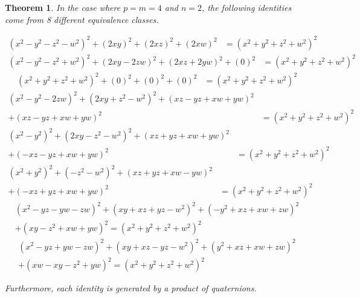 \documentclass[12pt]{article}
\newtheorem{theorem}{Theorem}[section]
\theoremstyle{definition}
\theoremstyle{remark}
\numberwithin{equation}{section}
\begin{document}
\begin{theorem}
\label{theorem_8_classes}
In the case where  \(p = m = 4\) and \(n = 2\),
the following identities 
come from 8 different
equivalence classes.

    \begin{align}
    \label{Identity_1}
    (x^2 - y^2 - z^2 - w^2 )^2 + (2xy)^2 + (2xz)^2 + (2xw)^2 
    &= (x^2 + y^2 + z^2 + w^2)^2 
\end{align}
\begin{align}
\label{Identity_2}
    (x^2 - y^2 - z^2 + w^2 )^2 + (2xy - 2zw)^2 + (2xz + 2yw)^2 + (0)^2 
    &= (x^2 + y^2 + z^2 + w^2)^2
\end{align}
\begin{align}
\label{Identity_3}
    (x^2 + y^2 + z^2 + w^2 )^2 + (0)^2 + (0)^2 + (0)^2 
    &= (x^2 + y^2 + z^2 + w^2)^2
\end{align}
\begin{align}
\label{Identity_4}
    (x^2 - y^2 - 2zw )^2 + (2xy + z^2 - w^2)^2 
    + (xz - yz + xw + yw)^2\nonumber
    \\
    + (xz - yz + xw + yw)^2 
        &= (x^2 + y^2 + z^2 + w^2)^2
\end{align}
\begin{align}
\label{Identity_5}
    (x^2 - y^2 )^2 + (2xy - z^2 - w^2)^2 
        + (xz + yz + xw + yw)^2 \nonumber
        \\
        + (-xz - yz + xw + yw)^2 
    &= (x^2 + y^2 + z^2 + w^2)^2
\end{align}
\begin{align}
\label{Identity_6}
    (x^2 + y^2 )^2 + (- z^2 - w^2)^2 
        + (xz + yz + xw - yw)^2  \nonumber
        \\
      + (-xz + yz + xw + yw)^2
    &= (x^2 + y^2 + z^2 + w^2)^2
\end{align}
\begin{align}
\label{Identity_7}
    (x^2 - yz - yw - zw )^2 + (xy + xz + yz - w^2)^2 
        + (-y^2 + xz + xw + zw)^2 \nonumber
        \\
        + (xy - z^2 + xw + yw)^2 
    = (x^2 + y^2 + z^2 + w^2)^2
\end{align}
\begin{align}
\label{Identity_8}
    (x^2 - yz + yw - zw )^2 + (xy + xz - yz - w^2)^2 
        + (y^2 + xz + xw + zw)^2 \nonumber
        \\
        + (xw - xy - z^2  + yw)^2 
            = (x^2 + y^2 + z^2 + w^2)^2
    \end{align}



Furthermore,
each identity
is generated by a product of quaternions. 
\end{theorem}
\end{document}
